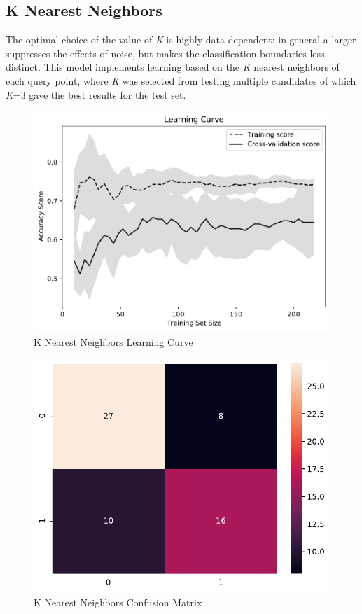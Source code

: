 \documentclass[conference]{IEEEtran}
\begin{document}
\subsection{K Nearest Neighbors}
The optimal choice of the value of \textit{K} is highly data-dependent: in general a larger suppresses the effects of noise, but makes the classification boundaries less distinct. This model implements learning based on the \textit{K} nearest neighbors of each query point, where \textit{K} was selected from testing multiple candidates of which \textit{K}=3 gave the best results for the test set.

\begin{figure}[H]
    \centerline{\includegraphics[width=0.9\linewidth]{images/KNeighborsClassifier_lc.pdf}}
    \caption{K Nearest Neighbors Learning Curve}
    \label{knn_lc}
\end{figure}

\noindent


\begin{figure}[H]
    \centerline{\includegraphics[width=0.8\linewidth]{images/k_nearest_neighbors_cm.pdf}}
    \caption{K Nearest Neighbors Confusion Matrix}
    \label{knn_cm}
\end{figure}
\end{document}

